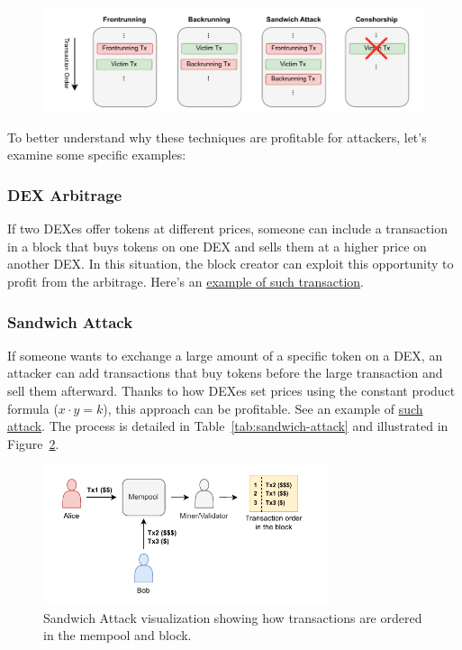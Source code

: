 \documentclass[12pt]{article}
\begin{document}
\begin{figure}[H]
  \centering
  \includegraphics[width=1\textwidth]{MEV.pdf}
  \label{fig:sandwich}
\end{figure}

\noindent
To better understand why these techniques are profitable for attackers, let's examine some specific examples:

\subsubsection*{DEX Arbitrage} If two DEXes offer tokens at different prices, someone can include a transaction in a block that buys tokens on one DEX and sells them at a higher price on another DEX. In this situation, the block creator can exploit this opportunity to profit from the arbitrage. Here's an \href{https://etherscan.io/tx/0x5e1657ef0e9be9bc72efefe59a2528d0d730d478cfc9e6cdd09af9f997bb3ef4}{example of such transaction}.

\subsubsection*{Sandwich Attack}
If someone wants to exchange a large amount of a specific token on a DEX, an attacker can add transactions that buy tokens before the large transaction and sell them afterward. Thanks to how DEXes set prices using the constant product formula ($x \cdot y = k$), this approach can be profitable. See an example of \href{https://eigenphi.io/mev/ethereum/tx/0x90204899500606f717cacd223fc27b2be0e017032c7f41986cfb094e686630b4}{such attack}. The process is detailed in Table~\ref{tab:sandwich-attack} and illustrated in Figure~\ref{fig:sandwich}.

\begin{figure}[H]
  \centering
  \includegraphics[width=0.75\textwidth]{sandwich.pdf}
  \caption{Sandwich Attack visualization showing how transactions are ordered in the mempool and block.}
  \label{fig:sandwich}
\end{figure}
\end{document}
